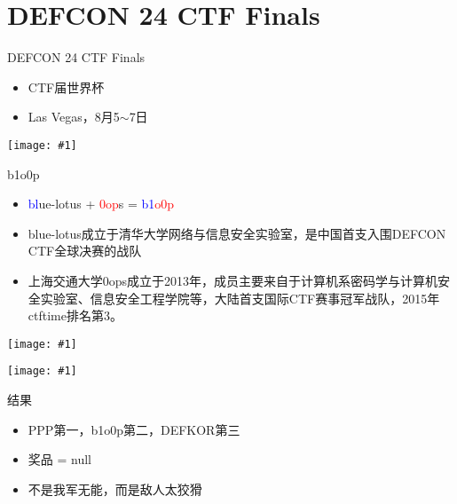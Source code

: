 \documentclass{beamer}
\newcommand{\image}[1]{
  \begin{frame}
    \texttt{[image: \#1]}
  \end{frame}
}
\begin{document}
\section{DEFCON 24 CTF Finals}

\begin{frame}
  \begin{block}{DEFCON 24 CTF Finals}
    \begin{itemize}
      \item CTF届世界杯
      \item Las Vegas，8月5$\sim$7日
    \end{itemize}
  \end{block}
\end{frame}

\image{img/ctf-platform.jpg}

\begin{frame}
  \begin{block}{b1o0p}
    \begin{itemize}
      \item \textcolor{blue}{bl}ue-lotus + \textcolor{red}{0op}s = \textcolor{blue}{b1}\textcolor{red}{o0p}
      \item blue-lotus成立于清华大学网络与信息安全实验室，是中国首支入围DEFCON CTF全球决赛的战队
      \item 上海交通大学0ops成立于2013年，成员主要来自于计算机系密码学与计算机安全实验室、信息安全工程学院等，大陆首支国际CTF赛事冠军战队，2015年ctftime排名第3。
    \end{itemize}
  \end{block}
\end{frame}

\image{img/b1o0p.jpg}

\image{img/b1o0p-onsite.jpg}

\begin{frame}
  \begin{block}{结果}
    \begin{itemize}[<+-|alert@+>]
      \item PPP第一，b1o0p第二，DEFKOR第三
      \item 奖品 = null
      \item 不是我军无能，而是敌人太狡猾
    \end{itemize}
  \end{block}
\end{frame}
\end{document}
